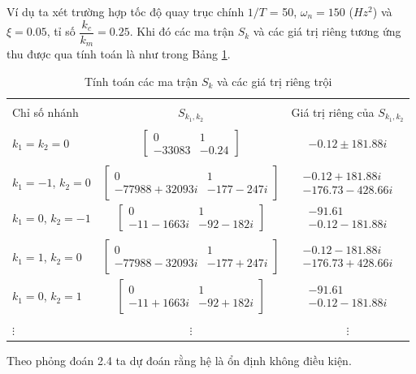 \documentclass[10pt,notheorems]{beamer}
\theoremstyle{definition}
\theoremstyle{definition}
\theoremstyle{definition}
\newcommand{\m}[1]{
	\begin{bmatrix}
		#1
\end{bmatrix}}
\newcommand{\pma}[1]{
	\begin{matrix}
		#1
\end{matrix}}
\begin{document}
\begin{frame}
	Ví dụ ta xét trường hợp tốc độ quay trục chính $1/T$ = 50, $\omega_n = 150$ ($Hz^2$) và $\xi = 0.05$, tỉ số $\dfrac{k_c}{k_m} = 0.25$.
	Khi đó các ma trận $S_k$ và các giá trị riêng tương ứng thu được qua tính toán là như trong Bảng \ref{bang 3}.
	
	\begin{table}[!h]
		\centering
		\begin{tabular}{lcc}
			\hline \\[-.35cm]	
			Chỉ số nhánh & $S_{k_1,k_2}$ & Giá trị riêng của $S_{k_1,k_2}$ \\ \hline \\[-.35cm]
			$k_1 = k_2 = 0$		   & $\m{0 & 1 \\ -33083 & -0.24}$ & $-0.12 \pm 181.88 i$ \\ \hline \\[-.35cm]
			$k_1 = -1$, $k_2 = 0$  & $\m{0 & 1 \\ -77988 + 32093i & -177 - 247i }$ &  
			$\pma{- 0.12 + 181.88 i \\ -176.73 - 428.66i}$ \\ 
			$k_1 = 0$, $k_2 = -1$	& $\m{0 & 1 \\ -11 - 1663i & -92 - 182i}$  &  $\pma{ -91.61 \\ - 0.12-181.88i}$ \\ \hline \\[-.35cm]
			$k_1 = 1$, $k_2 = 0$   & $\m{0 & 1 \\ -77988 - 32093i & -177 + 247i}$ &  
			$\pma{- 0.12 - 181.88 i \\ -176.73 + 428.66i}$ \\ 
			$k_1 = 0$, $k_2 = 1$	& $\m{0 & 1 \\ -11 + 1663i & -92 + 182i}$  &  $\pma{ -91.61 \\ - 0.12-181.88i}$ \\ \hline \\[-.35cm]
			$\vdots$ & $\vdots$ & $\vdots$ \\ \hline
		\end{tabular} 
		\caption{Tính toán các ma trận $S_k$ và các giá trị riêng trội}
		\label{bang 3}
	\end{table}
Theo phỏng đoán 2.4 ta dự đoán rằng hệ là ổn định không điều kiện.
\end{frame}
\end{document}
